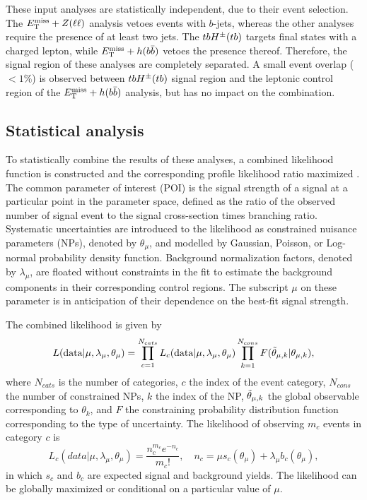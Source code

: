 These input analyses are statistically independent, due to their event selection. The $E_{\mathrm{T}}^{\mathrm{miss}}+Z(\ell\ell)$ analysis vetoes events with $b$-jets, whereas the other analyses require the presence of at least two jets. The $tbH^{\pm}(tb)$ targets final states with a charged lepton, while $E_{\mathrm{T}}^{\mathrm{miss}}+h(b\bar{b})$ vetoes the presence thereof. Therefore, the signal region of these analyses are completely separated. A small event overlap ($<1\%$) is observed between $tbH^{\pm}(tb)$ signal region and the leptonic control region of the $E_{\mathrm{T}}^{\mathrm{miss}}+h(b\bar{b})$ analysis, but has no impact on the combination.

\subsection{Statistical analysis}

To statistically combine the results of these analyses, a combined likelihood function is constructed and the corresponding profile likelihood ratio maximized \cite{Cowan:2010js}. The common parameter of interest (POI) is the signal strength of a \thdma signal at a particular point in the parameter space, defined as the ratio of the observed number of signal event to the signal cross-section times branching ratio. Systematic uncertainties are introduced to the likelihood as constrained nuisance parameters (NPs), denoted by $\theta_{\mu}$, and modelled by Gaussian, Poisson, or Log-normal probability density function. Background normalization factors, denoted by $\lambda_{\mu}$, are floated without constraints in the fit to estimate the background components in their corresponding control regions. The subscript $\mu$ on these parameter is in anticipation of their dependence on the best-fit signal strength.

The combined likelihood is given by
\begin{equation}
    \label{4.13}
    L(\mathrm{data}|\mu,\lambda_{\mu},\theta_{\mu})= \prod_{c=1}^{N_{cats}} {L}_c(\mathrm{data}|\mu, \lambda_{\mu}, \theta_{\mu}) \prod_{k=1}^{N_{cons}} {F}(\Tilde{\theta}_{\mu, k}|\theta_{\mu, k}),
\end{equation}
where $N_{cats}$ is the number of categories, $c$ the index of the event category, $N_{cons}$ the number of constrained NPs, $k$ the index of the NP, $\Tilde{\theta}_{\mu, k}$ the global observable corresponding to $\theta_k$, and $F$ the constraining probability distribution function corresponding to the type of uncertainty. 
The likelihood of observing $m_c$ events in category $c$ is
\begin{equation}
    \label{chap:phys-anal:14}
    L_c(data|\mu, \lambda_{\mu}, \theta_{\mu}) = \frac{n_c^{m_c}e^{-n_c}}{m_c!}, \quad n_c = \mu s_c(\theta_{\mu}) + \lambda_{\mu}b_c(\theta_{\mu}),
\end{equation}
in which $s_c$ and $b_c$ are expected signal and background yields.
The likelihood can be globally maximized or conditional on a particular value of $\mu$.

